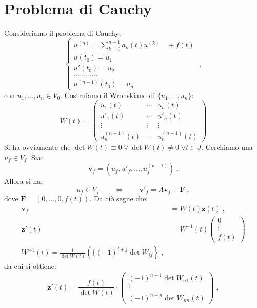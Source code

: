 \documentclass[a4paper,12pt]{report}
\theoremstyle{plain}
\theoremstyle{definition}
\theoremstyle{remark}
\numberwithin{equation}{section}
\begin{document}
\section{Problema di Cauchy}
Consideriamo il problema di Cauchy:
\begin{equation}
\begin{cases}
 u^{(n)}=\displaystyle{\sum_{k=0}^{n-1} a_k(t)u^{(k)}} \quad + f(t) \\
 u(t_0)=u_1 \\
 u'(t_0)=u_2 \\
\ldots \ldots \ldots \ldots \\
 u^{(n-1)}(t_0)=u_n 
\end{cases}\;,
\end{equation}
con $u_1,\ldots,u_n \in V_0$. Costruiamo il Wronskiano di $\{u_1,\ldots,u_n\}$:
\begin{equation}
W(t)= \begin{pmatrix}
       u_1(t) & \cdots & u_n(t) \\
       u'_1(t) & \cdots & u'_n(t) \\
       \vdots & \vdots & \vdots \\
       u_n^{(n-1)}(t) & \cdots & u_n^{(n-1)}(t)
      \end{pmatrix}
\end{equation}
Si ha ovviamente che $\det W(t) \equiv 0 \lor \det W(t) \ne 0\; \forall t \in J$. Cerchiamo una $u_f \in V_f$. Sia:
\begin{equation}
\mathbf{v}_f = (u_f,u'_f,\ldots,u_f^{(n-1)})\;.
\end{equation}
Allora si ha:
\begin{equation}
u_f \in V_f \qquad \Longleftrightarrow\qquad \mathbf{v}'_f = A\mathbf{v}_f + \mathbf{F}\;,
\end{equation}
dove $\mathbf{F}=(0,\ldots,0,f(t))$. Da ciò segue che:
\begin{align}
\mathbf{v}_f &= W(t)\mathbf{z}(t)\;, \\
\mathbf{z}'(t) &= W^{-1}(t)\begin{pmatrix}
0 \\
\vdots \\
f(t)
\end{pmatrix} \\
W^{-1}(t)=\frac{1}{\det W(t)}\left(\{(-1)^{i+j}\det W_{ij}\right\}\;,
\end{align}
da cui si ottiene:
\begin{equation}
\mathbf{z}'(t)=\frac{f(t)}{\det W(t)} \cdot \begin{pmatrix}
                                             (-1)^{n+1} \det W_{n1}(t) \\
\vdots \\
(-1)^{n+n} \det W_{nn}(t)
                                            \end{pmatrix}\;,
\end{equation}
\end{document}
